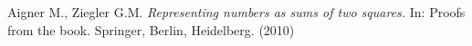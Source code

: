 \documentclass[12pt,a4paper]{amsart}
\def\HH{\mathbb{H}}
\def\ZZ{\mathbb{Z}}
\def\sl2{\mathrm{SL}(2, \ZZ)}
\begin{document}










Aigner M., Ziegler G.M.  
\textit{Representing numbers as sums of two squares.} In: Proofs from the book. Springer, Berlin, Heidelberg. (2010)
\end{document}
